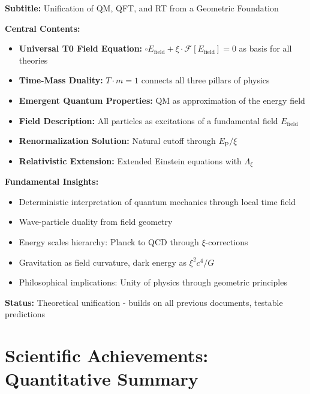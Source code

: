 \documentclass[12pt,a4paper]{article}
\newcommand{\xipar}{\xi}
\newcommand{\Efield}{E_{\text{field}}}
\newcommand{\EP}{E_{\text{P}}}
\begin{document}
	\begin{documentbox}
		\textbf{Subtitle:} Unification of QM, QFT, and RT from a Geometric Foundation
		
		\textbf{Central Contents:}
		\begin{itemize}
			\item \textbf{Universal T0 Field Equation:} $\square \Efield + \xipar \cdot \mathcal{F}[\Efield] = 0$ as basis for all theories
			\item \textbf{Time-Mass Duality:} $T \cdot m = 1$ connects all three pillars of physics
			\item \textbf{Emergent Quantum Properties:} QM as approximation of the energy field
			\item \textbf{Field Description:} All particles as excitations of a fundamental field $\Efield$
			\item \textbf{Renormalization Solution:} Natural cutoff through $\EP/\xipar$
			\item \textbf{Relativistic Extension:} Extended Einstein equations with $\Lambda_{\xipar}$
		\end{itemize}
		
		\textbf{Fundamental Insights:}
		\begin{itemize}
			\item Deterministic interpretation of quantum mechanics through local time field
			\item Wave-particle duality from field geometry
			\item Energy scales hierarchy: Planck to QCD through $\xipar$-corrections
			\item Gravitation as field curvature, dark energy as $\xipar^2 c^4 / G$
			\item Philosophical implications: Unity of physics through geometric principles
		\end{itemize}
		
		\textbf{Status:} Theoretical unification - builds on all previous documents, testable predictions
	\end{documentbox}
	
	\section{Scientific Achievements: Quantitative Summary}
	
\end{document}
